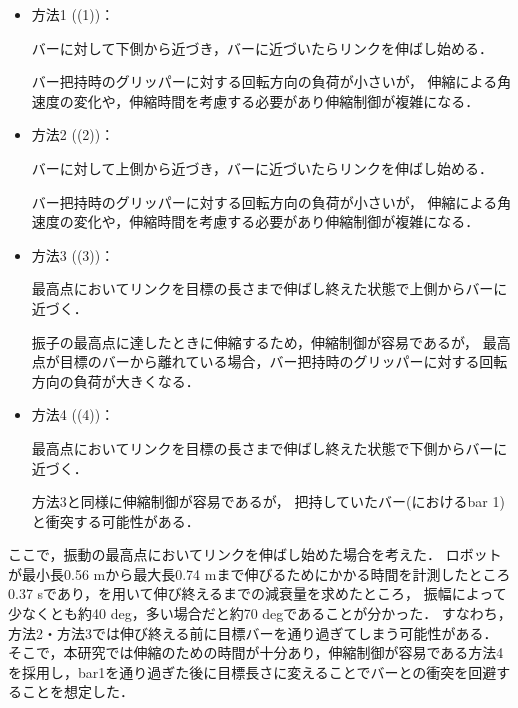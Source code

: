         \begin{itemize}
        \item 方法1 ((1))：
        
        バーに対して下側から近づき，バーに近づいたらリンクを伸ばし始める．

        バー把持時のグリッパーに対する回転方向の負荷が小さいが，
        伸縮による角速度の変化や，伸縮時間を考慮する必要があり伸縮制御が複雑になる．
        
        \item 方法2 ((2))：
        
        バーに対して上側から近づき，バーに近づいたらリンクを伸ばし始める．
        
        バー把持時のグリッパーに対する回転方向の負荷が小さいが，
        伸縮による角速度の変化や，伸縮時間を考慮する必要があり伸縮制御が複雑になる．

        \item 方法3 ((3))：
        
        最高点においてリンクを目標の長さまで伸ばし終えた状態で上側からバーに近づく．
        
        振子の最高点に達したときに伸縮するため，伸縮制御が容易であるが，
        最高点が目標のバーから離れている場合，バー把持時のグリッパーに対する回転方向の負荷が大きくなる．
        
        \item 方法4 ((4))：
        
        最高点においてリンクを目標の長さまで伸ばし終えた状態で下側からバーに近づく．

        方法3と同様に伸縮制御が容易であるが，
        把持していたバー(におけるbar 1)と衝突する可能性がある．

        \end{itemize}

        ここで，振動の最高点においてリンクを伸ばし始めた場合を考えた．
        ロボットが最小長0.56 mから最大長0.74 mまで伸びるためにかかる時間を計測したところ
        0.37 sであり，を用いて伸び終えるまでの減衰量を求めたところ，
        振幅によって少なくとも約40 deg，多い場合だと約70 degであることが分かった．
        すなわち，方法2・方法3では伸び終える前に目標バーを通り過ぎてしまう可能性がある．
        そこで，本研究では伸縮のための時間が十分あり，伸縮制御が容易である方法4を採用し，bar1を通り過ぎた後に目標長さに変えることでバーとの衝突を回避することを想定した．

